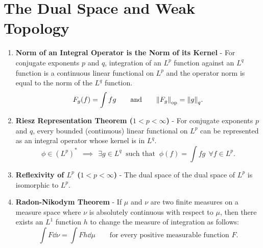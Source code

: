 \documentclass{article}
\begin{document}
    \section{The Dual Space and Weak Topology}
    \begin{enumerate}
        \item \textbf{Norm of an Integral Operator is the Norm of its Kernel} - For conjugate exponents $p$ and $q$, integration of an $L^p$ function against an $L^q$ function is a continuous linear functional on $L^p$ and the operator norm is equal to the norm of the $L^q$ function.  $$F_g(f) = \int fg \qquad \text{and} \qquad \norm{F_g}_\text{op} = \norm{g}_q.$$
        \item \textbf{Riesz Representation Theorem ($1 < p < \infty$)} - For conjugate exponents $p$ and $q$, every bounded (continuous) linear functional on $L^p$ can be represented as an integral operator whose kernel is in $L^q$.  $$\phi \in (L^p)^*\ \ \implies\ \ \exists g \in L^q\ \text{ such that }\ \phi(f) = \int f g\ \ \forall f \in L^p.$$
        \item \textbf{Reflexivity of $L^p$ ($1 < p < \infty$)} - The dual space of the dual space of $L^p$ is isomorphic to $L^p$.
        \item \textbf{Radon-Nikodym Theorem} - If $\mu$ and $\nu$ are two finite measures on a measure space where $\nu$ is absolutely continuous with respect to $\mu$, then there exists an $L^1$ function $h$ to change the measure of integration as follows: $$\int F \dd\nu = \int F h \dd\mu \qquad \text{for every positive measurable function } F.$$
    \end{enumerate}
\end{document}
